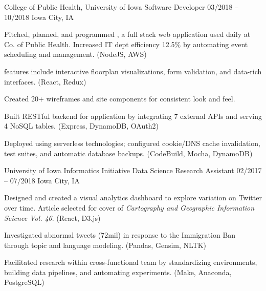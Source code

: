 \begin{cventries}
  \cventry
    {College of Public Health, University of Iowa} %
    {Software Developer}              %
    {03/2018 – 10/2018}               %
    {Iowa City, IA}                   %
    {
      \begin{cvitems}                 %
        \item {Pitched, planned, and programmed \cphbevts, a full stack web application used daily at Co. of Public Health. Increased IT dept efficiency 12.5\% by automating event scheduling and management. (NodeJS, AWS)\\
          \begin{projectitems}
            \item [\textendash] {\cphbevts{} features include interactive floorplan visualizations, form validation, and data-rich interfaces. (React, Redux)}
            \item [\textendash] {Created 20+ wireframes and site components for consistent look and feel.}
            \item [\textendash] {Built RESTful backend for application by integrating 7 external APIs and serving 4 NoSQL tables. (Express, DynamoDB, OAuth2)}
          	\item [\textendash] {Deployed using serverless technologies; configured cookie/DNS cache invalidation, test suites, and automatic database backups. (CodeBuild, Mocha, DynamoDB)}
          \end{projectitems}
        }
      \end{cvitems}
  }

  \cventry
    {University of Iowa Informatics Initiative}   %
    {Data Science Research Assistant}             %
    {02/2017 – 07/2018}                           %
    {Iowa City, IA}                               %
    {
      \begin{cvitems}
        \item {Designed and created a visual analytics dashboard to explore variation on Twitter over time. Article selected for cover of \textit{Cartography and Geographic Information Science Vol. 46}. (React, D3.js)}
        \item {Investigated abnormal tweets (72mil) in response to the Immigration Ban through topic and language modeling. (Pandas, Gensim, NLTK)}
        \item {Facilitated research within cross-functional team by standardizing environments, building data pipelines, and automating experiments. (Make, Anaconda, PostgreSQL)}
      \end{cvitems}
    }

\end{cventries}

